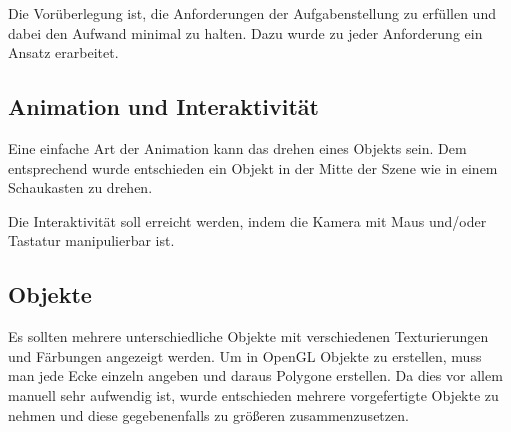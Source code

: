 \documentclass{scrreprt}
\begin{document}
Die Vorüberlegung ist, die Anforderungen der Aufgabenstellung zu erfüllen und dabei den Aufwand minimal zu halten. Dazu wurde zu jeder Anforderung ein Ansatz erarbeitet.
\subsection{Animation und Interaktivität}
Eine einfache Art der Animation kann das drehen eines Objekts sein. Dem entsprechend wurde entschieden ein Objekt in der Mitte der Szene wie in einem Schaukasten zu drehen.

Die Interaktivität soll erreicht werden, indem die Kamera mit Maus und/oder Tastatur manipulierbar ist.

\subsection{Objekte}
Es sollten mehrere unterschiedliche Objekte mit verschiedenen Texturierungen und Färbungen angezeigt werden. Um in OpenGL Objekte zu erstellen, muss man jede Ecke einzeln angeben und daraus Polygone erstellen. Da dies vor allem manuell sehr aufwendig ist, wurde entschieden mehrere vorgefertigte Objekte zu nehmen und diese gegebenenfalls zu größeren zusammenzusetzen. 
\end{document}
